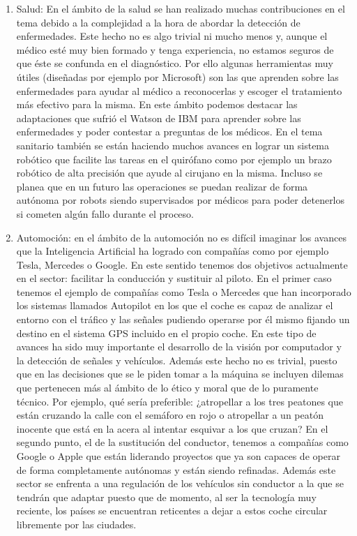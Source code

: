 \begin{enumerate}
  \item Salud: En el ámbito de la salud se han realizado muchas contribuciones en el tema debido a la complejidad a la hora de abordar la detección de enfermedades. Este hecho no es algo trivial ni mucho menos y, aunque el médico esté muy bien formado y tenga experiencia, no estamos seguros de que éste se confunda en el diagnóstico. Por ello algunas herramientas muy útiles (diseñadas por ejemplo por Microsoft) son las que aprenden sobre las enfermedades para ayudar al médico a reconocerlas y escoger el tratamiento más efectivo para la misma. En este ámbito podemos destacar las adaptaciones que sufrió el Watson de IBM para aprender sobre las enfermedades y poder contestar a preguntas de los médicos. En el tema sanitario también se están haciendo muchos avances en lograr un sistema robótico que facilite las tareas en el quirófano como por ejemplo un brazo robótico de alta precisión que ayude al cirujano en la misma. Incluso se planea que en un futuro las operaciones se puedan realizar de forma autónoma por robots siendo supervisados por médicos para poder detenerlos si cometen algún fallo durante el proceso.
  \item Automoción: en el ámbito de la automoción no es difícil imaginar los avances que la Inteligencia Artificial ha logrado con compañías como por ejemplo Tesla, Mercedes o Google. En este sentido tenemos dos objetivos actualmente en el sector: facilitar la conducción y sustituir al piloto. En el primer caso tenemos el ejemplo de compañías como Tesla o Mercedes que han incorporado los sistemas llamados Autopilot en los que el coche es capaz de analizar el entorno con el tráfico y las señales pudiendo operarse por él mismo fijando un destino en el sistema GPS incluido en el propio coche. En este tipo de avances ha sido muy importante el desarrollo de la visión por computador y la detección de señales y vehículos. Además este hecho no es trivial, puesto que en las decisiones que se le piden tomar a la máquina se incluyen dilemas que pertenecen más al ámbito de lo ético y moral que de lo puramente técnico. Por ejemplo, qué sería preferible: ¿atropellar a los tres peatones que están cruzando la calle con el semáforo en rojo o atropellar a un peatón inocente que está en la acera al intentar esquivar a los que cruzan? En el segundo punto, el de la sustitución del conductor, tenemos a compañías como Google o Apple que están liderando proyectos que ya son capaces de operar de forma completamente autónomas y están siendo refinadas. Además este sector se enfrenta a una regulación de los vehículos sin conductor a la que se tendrán que adaptar puesto que de momento, al ser la tecnología muy reciente, los países se encuentran reticentes a dejar a estos coche circular libremente por las ciudades.

\end{enumerate}
